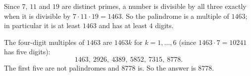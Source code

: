 Since $7$, $11$ and $19$ are distinct primes, a number is divisible by all three exactly when it is divisible by $7\cdot11\cdot19=1463$. So the palindrome is a multiple of $1463$; in particular it is at least $1463$ and has at least $4$ digits.

The four-digit multiples of $1463$ are $1463k$ for $k=1,\dots,6$ (since $1463\cdot7=10241$ has five digits):
\[1463,\ 2926,\ 4389,\ 5852,\ 7315,\ 8778.\]
The first five are not palindromes and $8778$ is. So the answer is $\boxed{8778}$.
